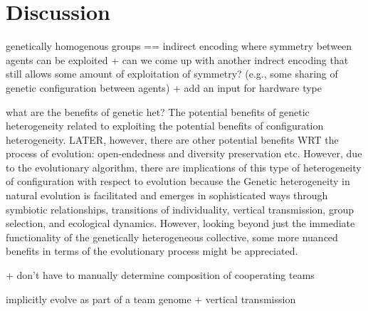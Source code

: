 \section{Discussion}

genetically homogenous groups == indirect encoding where symmetry between agents can be exploited
+ can we come up with another indrect encoding that still allows some amount of exploitation of symmetry? (e.g., some sharing of genetic configuration between agents)
+ add an input for hardware type

what are the benefits of genetic het?
The potential benefits of genetic heterogeneity related to exploiting the potential benefits of configuration heterogeneity.
LATER, however, there are other potential benefits WRT the process of evolution: open-endedness and diversity preservation etc.
However, due to the evolutionary algorithm, there are implications of this type of heterogeneity of configuration with respect to evolution because the
Genetic heterogeneity in natural evolution is facilitated and emerges in sophisticated ways through symbiotic relationships, transitions of individuality, vertical transmission, group selection, and ecological dynamics.
However, looking beyond just the immediate functionality of the genetically heterogeneous collective, some more nuanced benefits in terms of the evolutionary process might be appreciated.

+ don't have to manually determine composition of cooperating teams

implicitly evolve as part of a team genome \cite{bongard2000legion}
+ vertical transmission
